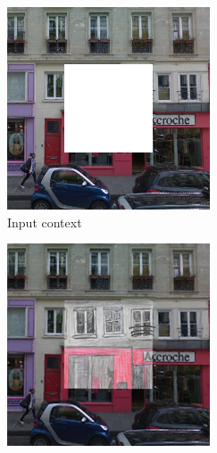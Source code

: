 \documentclass[preview]{standalone}
\begin{document}
\begin{figure}
\captionsetup[subfigure]{justification=centering}
  \begin{subfigure}[b]{.49\columnwidth}
    \centering
    \includegraphics[width=0.99\linewidth,height=0.99\linewidth]{figures/chapter02/0_data_ctx_overlap}
    \caption{Input context}
  \end{subfigure}
  \begin{subfigure}[b]{.49\columnwidth}
    \centering
    \includegraphics[width=0.99\linewidth,height=0.99\linewidth]{figures/chapter02/artist_overlap_227}

\end{subfigure}
\end{figure}
\end{document}
